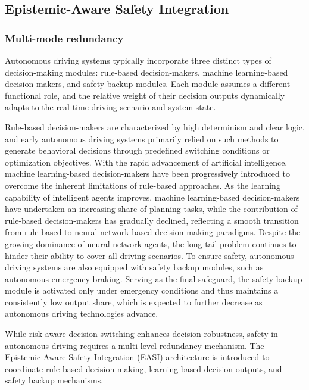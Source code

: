 \documentclass[preprint,12pt,authoryear]{elsarticle}
\begin{document}
\subsection{Epistemic-Aware Safety Integration}



\subsubsection{Multi-mode redundancy}

Autonomous driving systems typically incorporate three distinct types of decision-making modules: rule-based decision-makers, machine learning-based decision-makers, and safety backup modules. Each module assumes a different functional role, and the relative weight of their decision outputs dynamically adapts to the real-time driving scenario and system state.

Rule-based decision-makers are characterized by high determinism and clear logic, and early autonomous driving systems primarily relied on such methods to generate behavioral decisions through predefined switching conditions or optimization objectives.
With the rapid advancement of artificial intelligence, machine learning-based decision-makers have been progressively introduced to overcome the inherent limitations of rule-based approaches. As the learning capability of intelligent agents improves, machine learning-based decision-makers have undertaken an increasing share of planning tasks, while the contribution of rule-based decision-makers has gradually declined, reflecting a smooth transition from rule-based to neural network-based decision-making paradigms.
Despite the growing dominance of neural network agents, the long-tail problem continues to hinder their ability to cover all driving scenarios. To ensure safety, autonomous driving systems are also equipped with safety backup modules, such as autonomous emergency braking. Serving as the final safeguard, the safety backup module is activated only under emergency conditions and thus maintains a consistently low output share, which is expected to further decrease as autonomous driving technologies advance.

While risk-aware decision switching enhances decision robustness, safety in autonomous driving requires a multi-level redundancy mechanism. The Epistemic-Aware Safety Integration (EASI) architecture is introduced to coordinate rule-based decision making, learning-based decision outputs, and safety backup mechanisms.
\end{document}
